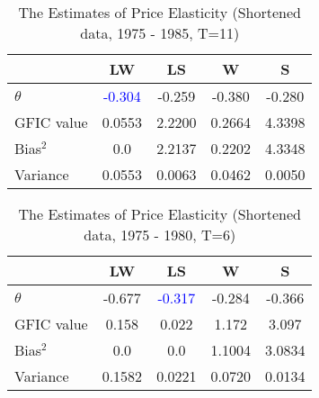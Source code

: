 \begin{table}[h!]\centering
 \caption{The Estimates of Price Elasticity (Shortened data, 1975 - 1985, T=11)}
\begin{tabular}{l c c c c }\hline\hline 
 & LW   &      LS   &       W   &      S\\
\hline
$\theta$ & \textcolor{blue}{-0.304} & -0.259 &  -0.380 &  -0.280\\
\hline
GFIC value &0.0553 & 2.2200 & 0.2664 &  4.3398\\
Bias$^2$ & 0.0 & 2.2137 & 0.2202 & 4.3348\\
Variance & 0.0553 & 0.0063 & 0.0462 & 0.0050\\ 
\hline
\hline
\end{tabular}
\end{table}



\begin{table}[h!]\centering
 \caption{The Estimates of Price Elasticity (Shortened data, 1975 - 1980, T=6)}
\begin{tabular}{l c c c c }\hline\hline 
 & LW   &      LS   &       W   &      S\\
\hline
$\theta$ & -0.677 & \textcolor{blue}{ -0.317} &  -0.284 &  -0.366\\
\hline
GFIC value &0.158 & 0.022 & 1.172& 3.097\\
Bias$^2$ & 0.0 & 0.0 & 1.1004 & 3.0834\\
Variance &0.1582 & 0.0221 & 0.0720 & 0.0134\\ 
\hline
\hline
\end{tabular}
\end{table}


